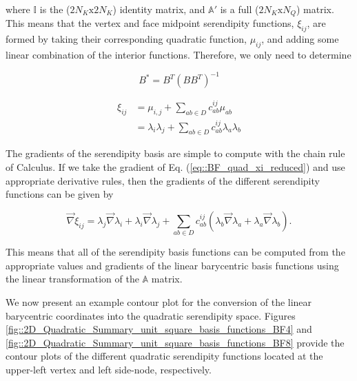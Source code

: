 \noindent where $\mathbb{I}$ is the ($2 N_K \text{x} 2 N_K$) identity matrix, and $\mathbb{A}'$ is a full ($2 N_K \text{x}  N_Q$) matrix. This means that the vertex and face midpoint serendipity functions, $\xi_{ij}$, are formed by taking their corresponding quadratic function, $\mu_{ij}$, and adding some linear combination of the interior functions. Therefore, we only need to determine 

\begin{equation}
\label{eq::BF_quad_MP_inverse}
B^* = B^T (B B^T)^{-1}
\end{equation}

\begin{equation}
\label{eq::BF_quad_xi_reduced}
\begin{aligned}
\xi_{ij} &=  \mu_{i,j} + \sum_{ab \in D} c_{ab}^{ij} \mu_{ab} \\
&=  \lambda_i \lambda_j + \sum_{ab \in D} c_{ab}^{ij}\lambda_a \lambda_b
\end{aligned}
\end{equation}

The gradients of the serendipity basis are simple to compute with the chain rule of Calculus. If we take the gradient of Eq. (\ref{eq::BF_quad_xi_reduced}) and use appropriate derivative rules, then the gradients of the different serendipity functions can be given by

\begin{equation}
\label{eq::BF_ser_gradient}
\vec{\nabla} \xi_{ij} = \lambda_j \vec{\nabla} \lambda_i + \lambda_i \vec{\nabla} \lambda_j + \sum_{ab \in D} c_{ab}^{ij} \left(  \lambda_b \vec{\nabla} \lambda_a + \lambda_a \vec{\nabla} \lambda_b \right) .
\end{equation}

\noindent This means that all of the serendipity basis functions can be computed from the appropriate values and gradients of the linear barycentric basis functions using the linear transformation of the $\mathbb{A}$ matrix.

We now present an example contour plot for the conversion of the linear barycentric coordinates into the quadratic serendipity space. Figures \ref{fig::2D_Quadratic_Summary_unit_square_basis_functions_BF4} and \ref{fig::2D_Quadratic_Summary_unit_square_basis_functions_BF8} provide the contour plots of the different quadratic serendipity functions located at the upper-left vertex and left side-node, respectively.

